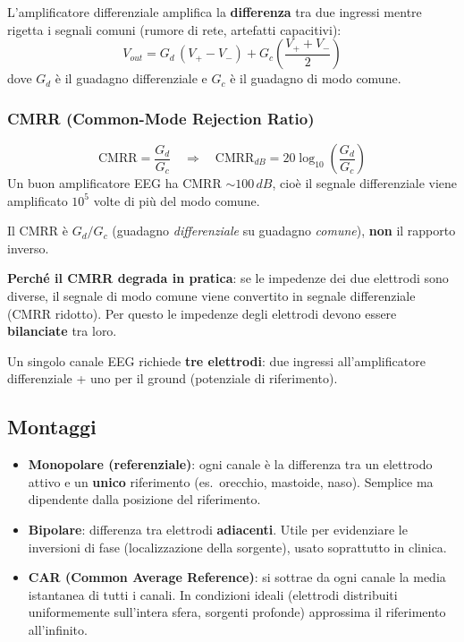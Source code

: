 L'amplificatore differenziale amplifica la \textbf{differenza} tra due ingressi mentre rigetta i segnali comuni (rumore di rete, artefatti capacitivi):
\[
V_{out} = G_d\,(V_+ - V_-) + G_c\left(\frac{V_+ + V_-}{2}\right)
\]
dove $G_d$ è il guadagno differenziale e $G_c$ è il guadagno di modo comune.

\subsubsection{CMRR (Common-Mode Rejection Ratio)}

\begin{definizione}[-- CMRR]
\[
\text{CMRR} = \frac{G_d}{G_c} \quad \Rightarrow \quad \text{CMRR}_{dB} = 20\log_{10}\!\left(\frac{G_d}{G_c}\right)
\]
Un buon amplificatore EEG ha CMRR $\sim 100\, dB$, cioè il segnale differenziale viene amplificato $10^5$ volte di più del modo comune.
\end{definizione}

\begin{attenzione}[]
Il CMRR è $G_d / G_c$ (guadagno \textit{differenziale} su guadagno \textit{comune}), \textbf{non} il rapporto inverso.
\end{attenzione}

\textbf{Perché il CMRR degrada in pratica}: se le impedenze dei due elettrodi sono diverse, il segnale di modo comune viene convertito in segnale differenziale (CMRR ridotto). Per questo le impedenze degli elettrodi devono essere \textbf{bilanciate} tra loro.

Un singolo canale EEG richiede \textbf{tre elettrodi}: due ingressi all'amplificatore differenziale + uno per il ground (potenziale di riferimento).

\subsection{Montaggi}

\begin{itemize}
    \item \textbf{Monopolare (referenziale)}: ogni canale è la differenza tra un elettrodo attivo e un \textbf{unico} riferimento (es.\ orecchio, mastoide, naso). Semplice ma dipendente dalla posizione del riferimento.
    \item \textbf{Bipolare}: differenza tra elettrodi \textbf{adiacenti}. Utile per evidenziare le inversioni di fase (localizzazione della sorgente), usato soprattutto in clinica.
    \item \textbf{CAR (Common Average Reference)}: si sottrae da ogni canale la media istantanea di tutti i canali. In condizioni ideali (elettrodi distribuiti uniformemente sull'intera sfera, sorgenti profonde) approssima il riferimento all'infinito.
\end{itemize}

